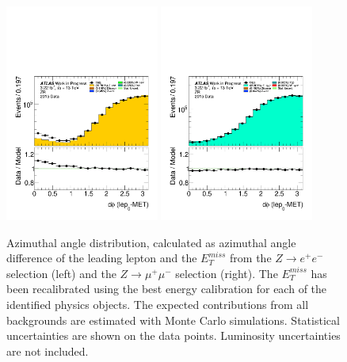 \begin{figure}[htbp]
\centering
\includegraphics[width=0.45\textwidth]{figures/ZR/dataMc-lepmet_dphi-ZR-el-log.pdf}
\includegraphics[width=0.45\textwidth]{figures/ZR/dataMc-lepmet_dphi-ZR-mu-log.pdf}
\caption{
Azimuthal angle distribution, calculated as azimuthal angle difference of the leading lepton and the $E_{T}^{miss}$ from the $Z \rightarrow e^+e^-$ selection (left) and the $Z \rightarrow \mu^+\mu^-$  selection (right).
The $E_{T}^{miss}$ has been recalibrated using the best energy calibration for each of the identified physics objects.
The expected contributions from all backgrounds are estimated with Monte Carlo simulations. 
Statistical uncertainties are shown on the data points.
Luminosity uncertainties are not included.
}
\label{fig:ZR_lepmet_dphi}
\end{figure}

